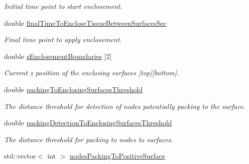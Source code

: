 \begin{DoxyCompactItemize}
\begin{DoxyCompactList}\small\item\em Initial time point to start enclosement. \end{DoxyCompactList}\item 
\hypertarget{classSimulation_ab7ef2d249b5d20a2fc0bc399a2b34e6d}{}double \hyperlink{classSimulation_ab7ef2d249b5d20a2fc0bc399a2b34e6d}{final\+Time\+To\+Enclose\+Tissue\+Between\+Surfaces\+Sec}\label{classSimulation_ab7ef2d249b5d20a2fc0bc399a2b34e6d}

\begin{DoxyCompactList}\small\item\em Final time point to apply enclosement. \end{DoxyCompactList}\item 
\hypertarget{classSimulation_a22bbc8742aed21f955c74c0ae2d60e59}{}double \hyperlink{classSimulation_a22bbc8742aed21f955c74c0ae2d60e59}{z\+Enclosement\+Boundaries} \mbox{[}2\mbox{]}\label{classSimulation_a22bbc8742aed21f955c74c0ae2d60e59}

\begin{DoxyCompactList}\small\item\em Current z position of the enclosing surfaces \mbox{[}top\mbox{]}\mbox{[}bottom\mbox{]}. \end{DoxyCompactList}\item 
\hypertarget{classSimulation_acc9eacb89b824cb028ff9e36cf2a8eda}{}double \hyperlink{classSimulation_acc9eacb89b824cb028ff9e36cf2a8eda}{packing\+To\+Enclosing\+Surfaces\+Threshold}\label{classSimulation_acc9eacb89b824cb028ff9e36cf2a8eda}

\begin{DoxyCompactList}\small\item\em The distance threshold for detection of nodes potentially packing to the surface. \end{DoxyCompactList}\item 
\hypertarget{classSimulation_a95a1b9f341e5485d7c83e638062e1751}{}double \hyperlink{classSimulation_a95a1b9f341e5485d7c83e638062e1751}{packing\+Detection\+To\+Enclosing\+Surfaces\+Threshold}\label{classSimulation_a95a1b9f341e5485d7c83e638062e1751}

\begin{DoxyCompactList}\small\item\em The distance threshold for packing to nodes to surfaces. \end{DoxyCompactList}\item 
\hypertarget{classSimulation_a7751a8ee737000de78a3347c259a9a07}{}std\+::vector$<$ int $>$ \hyperlink{classSimulation_a7751a8ee737000de78a3347c259a9a07}{nodes\+Packing\+To\+Positive\+Surface}\label{classSimulation_a7751a8ee737000de78a3347c259a9a07}


\end{DoxyCompactItemize}
